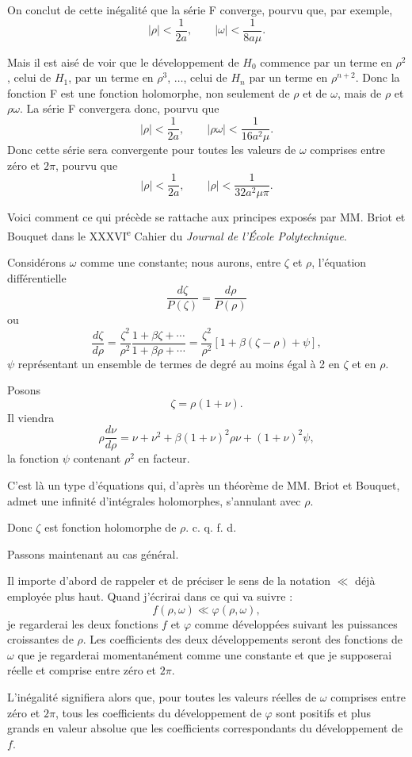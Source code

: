 \documentclass[11pt]{article}
\begin{document}
On conclut de cette inégalité que la série F converge, pourvu que, par exemple,
\[
|\rho|<\frac{1}{2a},
\qquad
|\omega|<\frac{1}{8a\mu}.
\]

Mais il est aisé de voir que le développement de $H_0$ commence par un terme en $\rho^2$, celui de $H_1$, par un terme en $\rho^3$, $\ldots$, celui de $H_n$ par un terme en $\rho^{n+2}$. Donc la fonction F est une fonction holomorphe, non seulement de $\rho$ et de $\omega$, mais de $\rho$ et $\rho\omega$. La série F convergera donc, pourvu que
\[
|\rho|<\frac{1}{2a},
\qquad
|\rho\omega|<\frac{1}{16a^2\mu}.
\]
Donc cette série sera convergente pour toutes les valeurs de $\omega$ comprises entre zéro et $2\pi$, pourvu que
\[
|\rho|<\frac{1}{2a},
\qquad
|\rho|<\frac{1}{32a^2\mu\pi}.
\]

Voici comment ce qui précède se rattache aux principes exposés par MM. Briot et Bouquet dans le XXXVI\textsuperscript{e} Cahier du \emph{Journal de l’École Polytechnique}.

Considérons $\omega$ comme une constante; nous aurons, entre $\zeta$ et $\rho$, l’équation différentielle
\[
\frac{d\zeta}{P(\zeta)}=\frac{d\rho}{P(\rho)}
\]
ou
\[
\frac{d\zeta}{d\rho}
=\frac{\zeta^2}{\rho^2}\frac{1+\beta\zeta+\cdots}{1+\beta\rho+\cdots}
=\frac{\zeta^2}{\rho^2}[1+\beta(\zeta-\rho)+\psi],
\]
$\psi$ représentant un ensemble de termes de degré au moins égal à 2 en $\zeta$ et en $\rho$.

Posons
\[
\zeta=\rho(1+\nu).
\]
Il viendra
\[
\rho\frac{d\nu}{d\rho}=\nu+\nu^2+\beta(1+\nu)^2\rho\nu+(1+\nu)^2\psi,
\]
la fonction $\psi$ contenant $\rho^2$ en facteur.

C’est là un type d’équations qui, d’après un théorème de MM. Briot et Bouquet, admet une infinité d’intégrales holomorphes, s’annulant avec $\rho$.

Donc $\zeta$ est fonction holomorphe de $\rho$. \hfill c. q. f. d.

Passons maintenant au cas général.

Il importe d’abord de rappeler et de préciser le sens de la notation $\ll$ déjà employée plus haut. Quand j’écrirai dans ce qui va suivre :
\[
f(\rho,\omega)\ll\varphi(\rho,\omega),
\]
je regarderai les deux fonctions $f$ et $\varphi$ comme développées suivant les puissances croissantes de $\rho$. Les coefficients des deux développements seront des fonctions de $\omega$ que je regarderai momentanément comme une constante et que je supposerai réelle et comprise entre zéro et $2\pi$.

L’inégalité signifiera alors que, pour toutes les valeurs réelles de $\omega$ comprises entre zéro et $2\pi$, tous les coefficients du développement de $\varphi$ sont positifs et plus grands en valeur absolue que les coefficients correspondants du développement de $f$.
\end{document}
